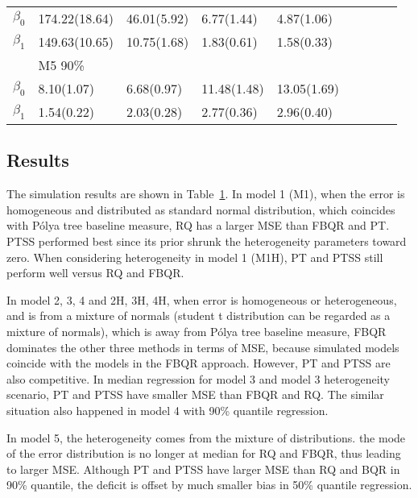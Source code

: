 \documentclass[12pt]{article}
\newcommand{\polya}{P\'{o}lya}
\begin{document}
\begin{center}
\begin{table}[h]
\begin{tabular}[tb]{c|llll|llll}
      $\beta_0$ & 174.22(18.64) & 46.01(5.92) & 6.77(1.44)  & 4.87(1.06)  &              &             &             &             \\
      $\beta_1$ & 149.63(10.65) & 10.75(1.68) & 1.83(0.61)  & 1.58(0.33)  &              &             &             &             \\
                & M5 90\%       &             &             &             &              &             &             &             \\
      $\beta_0$ & 8.10(1.07)    & 6.68(0.97)  & 11.48(1.48) & 13.05(1.69) &              &             &             &             \\
      $\beta_1$ & 1.54(0.22)    & 2.03(0.28)  & 2.77(0.36)  & 2.96(0.40)  &              &             &             &             \\
\hline
    \end{tabular}
    \label{tab:m1}
  \end{table}
\end{center}

\subsection{Results}
The simulation results are shown in Table~\ref{tab:m1}.  In model 1
(M1), when the error is homogeneous and distributed as standard normal
distribution, which coincides with \polya{} tree baseline measure, RQ
has a larger MSE than FBQR and PT. PTSS performed best since its prior
shrunk the heterogeneity parameters toward zero.  When considering
heterogeneity in model 1 (M1H), PT and PTSS still perform well versus
RQ and FBQR.

In model 2, 3, 4 and 2H, 3H, 4H, when error is homogeneous or
heterogeneous, and is from a mixture of normals (student t
distribution can be regarded as a mixture of normals), which is away
from \polya{} tree baseline measure, FBQR dominates the other three
methods in terms of MSE, because simulated models coincide with the
models in the FBQR approach. However, PT and PTSS are also
competitive.  In median regression for model 3 and model 3
heterogeneity scenario, PT and PTSS have smaller MSE than FBQR and RQ.
The similar situation also happened in model 4 with 90\% quantile
regression.

In model 5, the heterogeneity comes from the mixture of distributions.
the mode of the error distribution is no longer at median for RQ and
FBQR, thus leading to larger MSE. Although PT and PTSS have larger MSE
than RQ and BQR in 90\% quantile, the deficit is offset by much
smaller bias in 50\% quantile regression.
\end{document}
